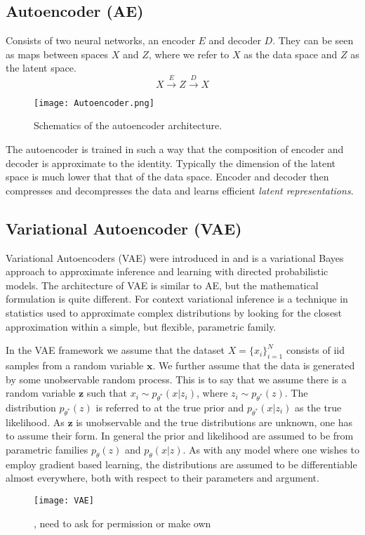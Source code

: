 \documentclass[../../thesis.tex]{subfiles}
\begin{document}
\subsection{Autoencoder (AE)}

Consists of two neural networks, an encoder $E$ and decoder $D$. They can be seen as maps between spaces $X$ and $Z$, where we refer to $X$ as the data space and $Z$ as the latent space. 
\begin{equation}
    X \xrightarrow{E} Z \xrightarrow{D} X 
\end{equation}

\begin{figure}[h]
    \texttt{[image: Autoencoder.png]}
    \centering
    \caption{Schematics of the autoencoder architecture.}
    \label{fig:autoencoder}
\end{figure}

The autoencoder is trained in such a way that the composition of encoder and decoder is approximate to the identity. Typically the dimension of the latent space is much lower that that of the data space. Encoder and decoder then compresses and decompresses the data and learns efficient \textit{latent representations}. 

\subsection{Variational Autoencoder (VAE)}
Variational Autoencoders (VAE) were introduced in \cite{kingma2022autoencoding} and is a variational Bayes approach to approximate inference and learning with directed probabilistic models. The architecture of VAE is similar to AE, but the mathematical formulation is quite different. For context variational inference is a technique in statistics used to approximate complex distributions by looking for the closest approximation within a simple, but flexible, parametric family. \newline 

In the VAE framework we assume that the dataset $X = \{x_i\}_{i=1}^{N}$ consists of iid samples from a random variable $\mathbf{x}$. We further assume that the data is generated by some unobservable random process. This is to say that we assume there is a random variable $\mathbf{z}$ such that $x_i \sim p_{\theta^*}(x|z_i)$, where $z_i \sim p_{\theta^*}(z)$. The distribution $p_{\theta^*}(z)$ is referred to at the true prior and $p_{\theta^*}(x|z_i)$ as the true likelihood. As $\mathbf{z}$ is unobservable and the true distributions are unknown, one has to assume their form. In general the prior and likelihood are assumed to be from parametric families $p_{\theta}(z)$ and $p_{\theta}(x|z)$. As with any model where one wishes to employ gradient based learning, the distributions are assumed to be differentiable almost everywhere, both with respect to their parameters and argument.\newline
\begin{figure}[h]
    \texttt{[image: VAE]}
    \centering  
    \caption{\cite{VAE}, need to ask for permission or make own}  
\end{figure}
\end{document}
